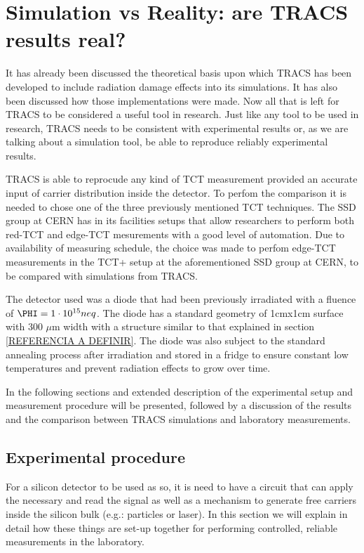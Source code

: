\chapter{Simulation vs Reality: are TRACS results real?}

It has already been discussed the theoretical basis upon which TRACS has been developed to include radiation damage effects into its simulations. It has also been discussed how those implementations were made. Now all that is left for TRACS to be considered a useful tool in research. Just like any tool to be used in research, TRACS needs to be consistent with experimental results or, as we are talking about a simulation tool, be able to reproduce reliably experimental results.

TRACS is able to reprocude any kind of TCT measurement provided an accurate input of carrier distribution inside the detector. To perfom the comparison it is needed to chose one of the three previously mentioned TCT techniques. The SSD group at CERN has in its facilities setups that allow researchers to perform both red-TCT and edge-TCT mesurements with a good level of automation. Due to availability of measuring schedule, the choice was made to perfom edge-TCT measurements in the TCT+ setup at the aforementioned SSD group at CERN, to be compared with simulations from TRACS.

The detector used was a diode that had been previously irradiated with a fluence of $\PHI = 1 \cdot 10^{15} neq$.  The diode has a standard geometry of 1cmx1cm surface with 300 $\mu$m width with a structure similar to that explained in section \ref{REFERENCIA A DEFINIR}. The diode was also subject to the standard annealing process after irradiation and stored in a fridge to ensure constant low temperatures and prevent radiation effects to grow over time. 

In the following sections and extended description of the experimental setup and  measurement procedure will be presented, followed by a discussion of the results and the comparison between TRACS simulations and laboratory measurements.

\section{Experimental procedure} %
\label{sec:future_improvements}

For a silicon detector to be used as so, it is need to have a circuit that can apply the necessary \vias and read the signal as well as a mechanism to generate free carriers inside the silicon bulk (e.g.: particles or laser). In this section we will explain in detail how these things are set-up together for performing controlled, reliable measurements in the laboratory.

